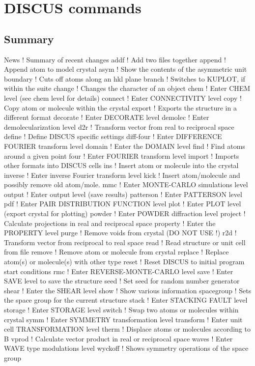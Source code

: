 \chapter{DISCUS commands}
\section{Summary}
\par
\begin{MacVerbatim}
News       ! Summary of recent changes
addf       ! Add two files together
append     ! Append atom to model crystal
asym       ! Show the contents of the asymmetric unit
boundary   ! Cuts off atoms along an hkl plane
branch     ! Switches to KUPLOT, if within the suite
change     ! Changes the character of an object
chem       ! Enter CHEM level (see chem level for details)
connect    ! Enter CONNECTIVITY level
copy       ! Copy atom or molecule within the crystal
export     ! Exports the structure in a different format
decorate   ! Enter  DECORATE level
demolec    ! Enter demolecularization level
d2r        ! Transform vector from real to reciprocal space
define     ! Define DISCUS specific settings
diff-four  ! Enter DIFFERENCE FOURIER transform level
domain     ! Enter the DOMAIN level
find       ! Find atoms around a given point
four       ! Enter FOURIER transform level
import     ! Imports other formats into DISCUS cells
ins        ! Insert atom or molecule into the crystal
inverse    ! Enter inverse Fourier transform level
kick       ! Insert atom/molecule and possibly remove old atom/mole.
mmc        ! Enter MONTE-CARLO simulations level
output     ! Enter output level (save results)
patterson  ! Enter PATTERSON level
pdf        ! Enter PAIR DISTRIBUTION FUNCTION level
plot       ! Enter PLOT level (export crystal for plotting)
powder     ! Enter POWDER diffraction level
project    ! Calculate projections in real and reciprocal space
property   ! Enter the PROPERTY level
purge      ! Remove voids from crystal (DO NOT USE !)
r2d        ! Transform vector from reciprocal to real space
read       ! Read structure or unit cell from file
remove     ! Remove atom or molecule from crystal
replace    ! Replace atom(s) or molecule(s) with other type
reset      ! Reset DISCUS to initial program start conditions
rmc        ! Enter REVERSE-MONTE-CARLO level
save       ! Enter SAVE level to save the structure
seed       ! Set seed for random number generator
shear      ! Enter the SHEAR level
show       ! Show various information
spacegroup ! Sets the space group for the current structure
stack      ! Enter STACKING FAULT level
storage    ! Enter STORAGE level
switch     ! Swap two atoms or molecules within crystal
symm       ! Enter SYMMETRY transformation level
transform  ! Enter unit cell TRANSFORMATION  level
therm      ! Displace atoms or molecules according to B
vprod      ! Calculate vector product in real or reciprocal space
waves      ! Enter WAVE type modulations level
wyckoff    ! Shows symmetry operations of the space group
\end{MacVerbatim}
